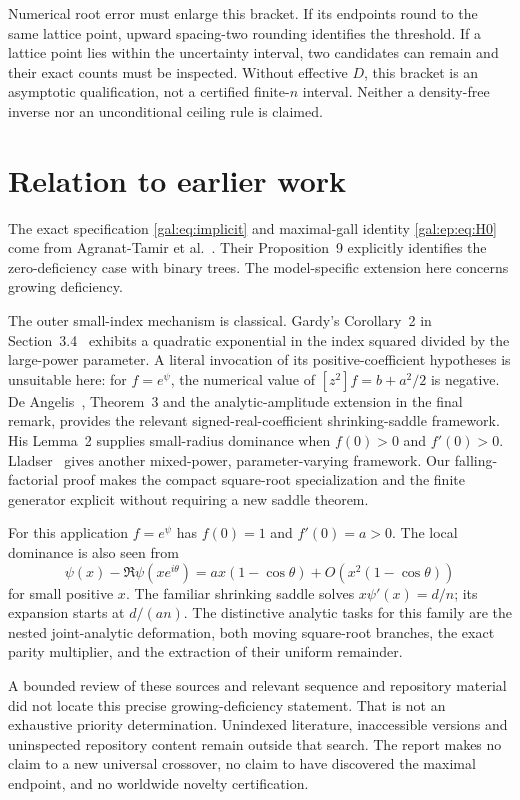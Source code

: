 \documentclass[11pt,letterpaper]{article}
\numberwithin{equation}{section}
\theoremstyle{definition}\newtheorem{definition}[theorem]{Definition}
\theoremstyle{remark}\newtheorem{remark}[theorem]{Remark}
\begin{document}
Numerical root error must enlarge this bracket. If its endpoints round to the same lattice point, upward spacing-two rounding identifies the threshold. If a lattice point lies within the uncertainty interval, two candidates can remain and their exact counts must be inspected. Without effective $D$, this bracket is an asymptotic qualification, not a certified finite-$n$ interval. Neither a density-free inverse nor an unconditional ceiling rule is claimed.

\section{Relation to earlier work}\label{gal:ep:sec:prior}
The exact specification \eqref{gal:eq:implicit} and maximal-gall identity \eqref{gal:ep:eq:H0} come from Agranat-Tamir et al.~\cite{comparison}. Their Proposition~9 explicitly identifies the zero-deficiency case with binary trees. The model-specific extension here concerns growing deficiency.

The outer small-index mechanism is classical. Gardy's Corollary~2 in Section~3.4~\cite{Gardy} exhibits a quadratic exponential in the index squared divided by the large-power parameter. A literal invocation of its positive-coefficient hypotheses is unsuitable here: for $f=e^\psi$, the numerical value of $[z^2]f=b+a^2/2$ is negative. De Angelis~\cite{DeAngelis}, Theorem~3 and the analytic-amplitude extension in the final remark, provides the relevant signed-real-coefficient shrinking-saddle framework. His Lemma~2 supplies small-radius dominance when $f(0)>0$ and $f'(0)>0$. Lladser~\cite{Lladser} gives another mixed-power, parameter-varying framework. Our falling-factorial proof makes the compact square-root specialization and the finite generator explicit without requiring a new saddle theorem.

For this application $f=e^\psi$ has $f(0)=1$ and $f'(0)=a>0$. The local dominance is also seen from
\[
\psi(x)-\Re\psi(xe^{i\theta})
=ax(1-\cos\theta)+O(x^2(1-\cos\theta))
\]
for small positive $x$. The familiar shrinking saddle solves $x\psi'(x)=d/n$; its expansion starts at $d/(an)$. The distinctive analytic tasks for this family are the nested joint-analytic deformation, both moving square-root branches, the exact parity multiplier, and the extraction of their uniform remainder.

A bounded review of these sources and relevant sequence and repository material did not locate this precise growing-deficiency statement. That is not an exhaustive priority determination. Unindexed literature, inaccessible versions and uninspected repository content remain outside that search. The report makes no claim to a new universal crossover, no claim to have discovered the maximal endpoint, and no worldwide novelty certification.
\end{document}
